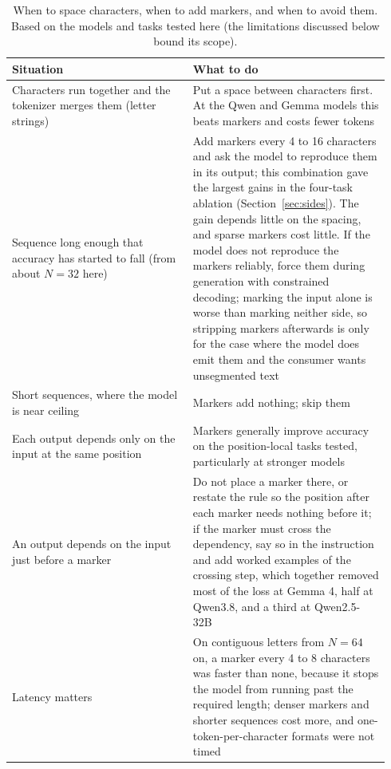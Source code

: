 \documentclass[10pt]{article} %
\begin{document}
\begin{table}[!htbp]
\centering
\small
\caption{When to space characters, when to add markers, and when to avoid them. Based on the models and tasks tested here (the limitations discussed below bound its scope).}
\label{tab:decision}
\begin{tabular}{p{0.45\linewidth} p{0.49\linewidth}}
\toprule
Situation & What to do \\
\midrule
Characters run together and the tokenizer merges them (letter strings) & Put a space between characters first. At the Qwen and Gemma models this beats markers and costs fewer tokens \\
Sequence long enough that accuracy has started to fall (from about $N = 32$ here) & Add markers every 4 to 16 characters and ask the model to reproduce them in its output; this combination gave the largest gains in the four-task ablation (Section~\ref{sec:sides}). The gain depends little on the spacing, and sparse markers cost little. If the model does not reproduce the markers reliably, force them during generation with constrained decoding; marking the input alone is worse than marking neither side, so stripping markers afterwards is only for the case where the model does emit them and the consumer wants unsegmented text \\
Short sequences, where the model is near ceiling & Markers add nothing; skip them \\
Each output depends only on the input at the same position & Markers generally improve accuracy on the position-local tasks tested, particularly at stronger models \\
An output depends on the input just before a marker & Do not place a marker there, or restate the rule so the position after each marker needs nothing before it; if the marker must cross the dependency, say so in the instruction and add worked examples of the crossing step, which together removed most of the loss at Gemma 4, half at Qwen3.8, and a third at Qwen2.5-32B \\
Latency matters & On contiguous letters from $N = 64$ on, a marker every 4 to 8 characters was faster than none, because it stops the model from running past the required length; denser markers and shorter sequences cost more, and one-token-per-character formats were not timed \\
\bottomrule
\end{tabular}
\end{table}
\end{document}
